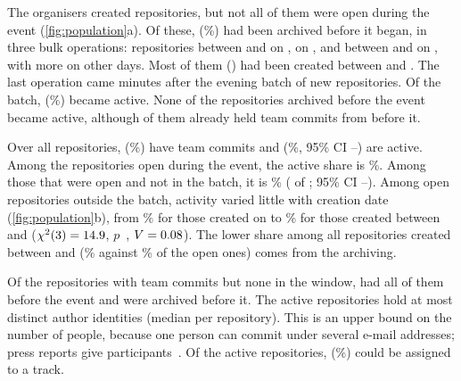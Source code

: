 \documentclass{article}
\begin{document}
The organisers created \NRqOneTotal{} repositories, but not all of them were open during the event (\cref{fig:population}a). Of these, \NRqOnePrearchivedN{} (\NRqOnePrearchivedPct\%) had been archived before it began, in three bulk operations: \NRqOnePrearchivedClustersSepOneFiveN{} repositories between \NRqOnePrearchivedClustersSepOneFiveFirst{} and \NRqOnePrearchivedClustersSepOneFiveLast{} on \sepfifteen, \NRqOnePrearchivedClustersSepOneSevenN{} on \sepseventeen{}, and \NRqOnePrearchivedClustersSepTwoTwoN{} between \NRqOnePrearchivedClustersSepTwoTwoFirst{} and \NRqOnePrearchivedClustersSepTwoTwoLast{} on \batchday{}, with \NRqOnePrearchivedOther{} more on other days. Most of them (\NRqOnePrearchivedCreatedSepOneFiveTwoOne) had been created between \sepfifteen{} and \septwentyone. The last operation came minutes after the evening batch of \NRqOneBatchN{} new repositories. Of the batch, \NRqOneBatchActiveN{} (\NRqOneBatchActivePct\%) became active. None of the repositories archived before the event became active, although \NRqOnePrearchivedWithCommits{} of them already held team commits from before it.

Over all repositories, \NRqOneWithCommitsN{} (\NRqOneWithCommitsPct\%) have team commits and \NRqOneActiveN{} (\NRqOneActivePct\%, 95\% CI \NRqOneActiveLo--\NRqOneActiveHi) are active. Among the \NRqOneOpenN{} repositories open during the event, the active share is \NRqOneActiveOfOpenPct\%. Among those that were open and not in the batch, it is \NRqOneActiveOfOpenNonbatchPct\% (\NRqOneActiveOfOpenNonbatchN{} of \NRqOneActiveOfOpenNonbatchOf; 95\% CI \NRqOneActiveOfOpenNonbatchLo--\NRqOneActiveOfOpenNonbatchHi). Among open repositories outside the batch, activity varied little with creation date (\cref{fig:population}b), from \NRqOneCreationSepTwoTwoOpenPct\% for those created on \batchday{} to \NRqOneCreationSepZeroOneOneFourOpenPct\% for those created between \sepone{} and \seponefour{} ($\chi^2(\num{3}) = \num{14.9}$, $p$~\NRqOneCreationChiTwoOpenNonbatchP, $V = \num{0.08}$). The lower share among all repositories created between \sepfifteen{} and \septwentyone{} (\NRqOneCreationSepOneFiveTwoOneAllPct\% against \NRqOneCreationSepOneFiveTwoOneOpenPct\% of the open ones) comes from the archiving.

Of the \NRqOneOutsideOnlyN{} repositories with team commits but none in the window, \NRqOneOutsideOnlyAllBeforeEvent{} had all of them before the event and \NRqOneOutsideOnlyPrearchived{} were archived before it. The active repositories hold at most \NRqOneAuthorsSum{} distinct author identities (median \NRqOneAuthorsMedian{} per repository). This is an upper bound on the number of people, because one person can commit under several e-mail addresses; press reports give \participantsreported{} participants~\cite{astanatimes2026guinness}. Of the active repositories, \NRqOneMatchedTrackN{} (\NRqOneMatchedTrackPct\%) could be assigned to a track.
\end{document}
